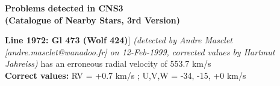 \def\ifhtx{\iffalse}
\ifhtx
\def\vMORE#1#2{\glutag{VizDetail,n V/70&-out.add=.&recno=#1|#2}}
\else 
\renewenvironment{glossary}{\begin{list}{}{\leftmargin=2em}}{\end{list}}
\def\ligne#1{\makebox[\textwidth][l]{\bf #1}}
\def\term#1{\item[\ligne{#1}]}
\def\vMORE #1#2{Line #1: #2}
\fi

\begin{center}
\LARGE\bf Problems detected in CNS3 \\
   (Catalogue of Nearby Stars, 3rd Version)
\end{center}
\bigskip

\begin{glossary}
\term{\vMORE{1972}{Gl 473} (Wolf 424)}
   {\em (detected by Andre Masclet [andre.masclet@wanadoo.fr] on
        12-Feb-1999, corrected values by Hartmut Jahreiss)}
   has an erroneous radial velocity of 553.7 km/s \\
   {\bf Correct values:}  RV = +0.7 km/s ; 
                 U,V,W = -34, -15, +0  km/s
\end{glossary}

